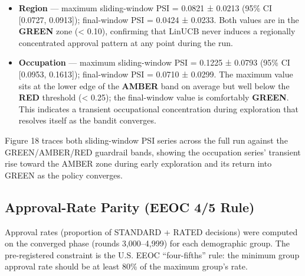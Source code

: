 \begin{itemize}
\tightlist
\item
  \textbf{Region} --- maximum sliding-window PSI = 0.0821 ± 0.0213 (95\% CI {[}0.0727, 0.0913{]}); final-window PSI = 0.0424 ± 0.0233. Both values are in the \textbf{GREEN} zone (\textless{} 0.10), confirming that LinUCB never induces a regionally concentrated approval pattern at any point during the run.
\item
  \textbf{Occupation} --- maximum sliding-window PSI = 0.1225 ± 0.0793 (95\% CI {[}0.0953, 0.1613{]}); final-window PSI = 0.0710 ± 0.0299. The maximum value sits at the lower edge of the \textbf{AMBER} band on average but well below the \textbf{RED} threshold (\textless{} 0.25); the final-window value is comfortably \textbf{GREEN}. This indicates a transient occupational concentration during exploration that resolves itself as the bandit converges.
\end{itemize}

Figure 18 traces both sliding-window PSI series across the full run against the GREEN/AMBER/RED guardrail bands, showing the occupation series' transient rise toward the AMBER zone during early exploration and its return into GREEN as the policy converges.


\subsection{Approval-Rate Parity (EEOC 4/5 Rule)}\label{approval-rate-parity-eeoc-45-rule}

Approval rates (proportion of STANDARD + RATED decisions) were computed on the converged phase (rounds 3,000--4,999) for each demographic group. The pre-registered constraint is the U.S. EEOC ``four-fifths'' rule: the minimum group approval rate should be at least 80\% of the maximum group's rate.


